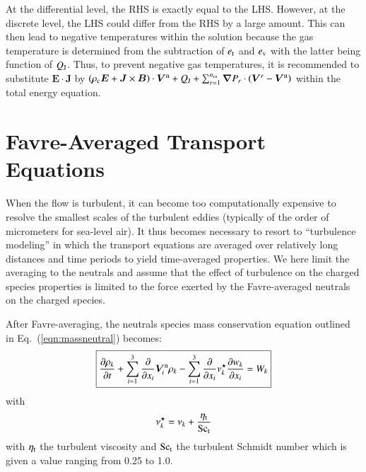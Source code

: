 \documentclass{warpdoc}
\newcommand\frameeqn[1]{\fbox{$\displaystyle #1$}}
\newcommand{\ncs}{{n_{\rm cs}}}
\newcommand{\visc}{\eta}
\renewcommand{\vec}[1]{\bm{#1}}
\begin{document}
%
At the differential level, the RHS is exactly equal to the LHS. However, at the discrete level, the LHS could differ from the RHS by a large amount. This can then lead to negative temperatures within the solution because the gas temperature is determined from the subtraction of $e_{\rm t}$ and $e_{\rm v}$ with the latter being function of $Q_{\rm J}$. Thus, to prevent negative gas temperatures, it is recommended to substitute $\vec{E}\cdot\vec{J}$ by $\left(\rho_{\rm c} \vec{E} + \vec{J}\times\vec{B} \right)\cdot \vec{V}^{\rm n}
+ Q_{\rm J} +  \sum_{r=1}^\ncs \vec{\nabla} P_r \cdot \left(\vec{V}^r-\vec{V}^{\rm n}\right)$ within the total energy equation.











\section{Favre-Averaged Transport Equations}

When the flow is turbulent, it can become too computationally expensive to resolve the smallest scales of the turbulent eddies (typically of the order of micrometers for sea-level air). It thus becomes necessary to resort to ``turbulence modeling'' in which the transport equations are averaged over relatively long distances and time periods to yield time-averaged properties. We here limit the averaging to the neutrals and assume that the effect of turbulence on the charged species properties is limited to the force exerted by the Favre-averaged neutrals on the charged species. 

After Favre-averaging, the neutrals species mass conservation equation outlined in Eq.\ (\ref{eqn:massneutral}) becomes:
%
\begin{equation}
\frameeqn{
  \frac{\partial \rho_k}{\partial t} + \sum_{i=1}^3 \frac{\partial}{\partial x_i} \vec{V}_i^{\rm n} \rho_k 
- \sum_{i=1}^3 \frac{\partial}{\partial x_i} \nu_k^\star \frac{\partial w_k}{\partial x_i}= W_k
}
\label{eqn:massneutral_turb}
\end{equation}
%
with
%
\begin{equation}
  \nu_k^\star=\nu_k +\frac{\visc_{\rm t}}{{\rm Sc_t}}
\end{equation}
%
with $\visc_{\rm t}$ the turbulent viscosity and $\rm Sc_t$ the turbulent Schmidt number which is given a value ranging from 0.25 to 1.0.
\end{document}
